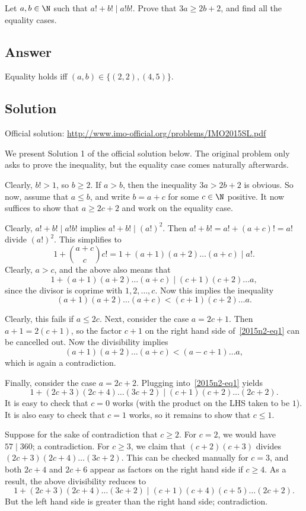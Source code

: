 Let $a, b \in \N$ such that $a! + b! \mid a! b!$.
Prove that $3a \geq 2b + 2$, and find all the equality cases.



\subsection*{Answer}

Equality holds iff $(a, b) \in \{(2, 2), (4, 5)\}$.



\subsection*{Solution}

Official solution: \url{http://www.imo-official.org/problems/IMO2015SL.pdf}

We present Solution 1 of the official solution below.
The original problem only asks to prove the inequality, but the equality case comes naturally afterwards.

Clearly, $b! > 1$, so $b \geq 2$.
If $a > b$, then the inequality $3a > 2b + 2$ is obvious.
So now, assume that $a \leq b$, and write $b = a + c$ for some $c \in \N$ positive.
It now suffices to show that $a \geq 2c + 2$ and work on the equality case.

Clearly, $a! + b! \mid a! b!$ implies $a! + b! \mid (a!)^2$.
Then $a! + b! = a! + (a + c)! = a!$ divide $(a!)^2$.
This simplifies to
\[ 1 + \binom{a + c}{c} c! = 1 + (a + 1)(a + 2) \ldots (a + c) \mid a!. \]
Clearly, $a > c$, and the above also means that
\[ 1 + (a + 1)(a + 2) \ldots (a + c) \mid (c + 1)(c + 2) \ldots a, \tag{1}\label{2015n2-eq1} \]
    since the divisor is coprime with $1, 2, \ldots, c$.
Now this implies the inequality
\[ (a + 1)(a + 2) \ldots (a + c) < (c + 1)(c + 2) \ldots a. \]

Clearly, this fails if $a \leq 2c$.
Next, consider the case $a = 2c + 1$.
Then $a + 1 = 2(c + 1)$, so the factor $c + 1$ on the right hand side of~\eqref{2015n2-eq1} can be cancelled out.
Now the divisibility implies
\[ (a + 1)(a + 2) \ldots (a + c) < (a - c + 1) \ldots a, \]
    which is again a contradiction.

Finally, consider the case $a = 2c + 2$.
Plugging into~\eqref{2015n2-eq1} yields
\[ 1 + (2c + 3)(2c + 4) \ldots (3c + 2) \mid (c + 1)(c + 2) \ldots (2c + 2). \]
It is easy to check that $c = 0$ works (with the product on the LHS taken to be $1$).
It is also easy to check that $c = 1$ works, so it remains to show that $c \leq 1$.

Suppose for the sake of contradiction that $c \geq 2$.
For $c = 2$, we would have $57 \mid 360$; a contradiction.
For $c \geq 3$, we claim that $(c + 2)(c + 3)$ divides $(2c + 3)(2c + 4) \ldots (3c + 2)$.
This can be checked manually for $c = 3$, and both $2c + 4$ and $2c + 6$ appear as factors on the right hand side if $c \geq 4$.
As a result, the above divisibility reduces to
\[ 1 + (2c + 3)(2c + 4) \ldots (3c + 2) \mid (c + 1)(c + 4)(c + 5) \ldots (2c + 2). \]
But the left hand side is greater than the right hand side; contradiction.
